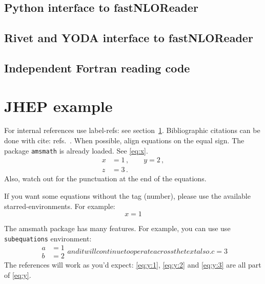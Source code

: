 \documentclass[a4paper,11pt]{article}
\begin{document}
\subsection{Python interface to fastNLOReader}

\subsection{Rivet and YODA interface to fastNLOReader}

\subsection{Independent Fortran reading code}


\clearpage
\appendix
\section{JHEP example}
\label{sec:intro}

For internal references use label-refs: see section~\ref{sec:intro}.
Bibliographic citations can be done with cite: refs.~\cite{a,b,c}.
When possible, align equations on the equal sign. The package
\texttt{amsmath} is already loaded. See \eqref{eq:x}.
\begin{equation}
\label{eq:x}
\begin{split}
x &= 1 \,,
\qquad
y = 2 \,,
\\
z &= 3 \,.
\end{split}
\end{equation}
Also, watch out for the punctuation at the end of the equations.


If you want some equations without the tag (number), please use the available
starred-environments. For example:
\begin{equation*}
x = 1
\end{equation*}

The amsmath package has many features. For example, you can use use
\texttt{subequations} environment:
\begin{subequations}\label{eq:y}
\begin{align}
\label{eq:y:1}
a & = 1
\\
\label{eq:y:2}
b & = 2
\end{align}
and it will continue to operate across the text also.
\begin{equation}
\label{eq:y:3}
c = 3
\end{equation}
\end{subequations}
The references will work as you'd expect: \eqref{eq:y:1},
\eqref{eq:y:2} and \eqref{eq:y:3} are all part of \eqref{eq:y}.
\end{document}
